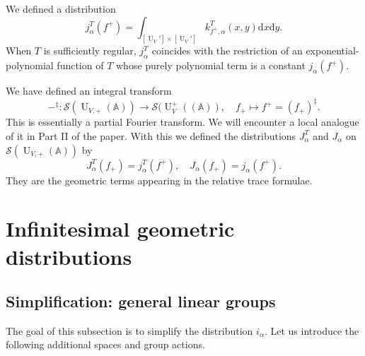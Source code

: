 \documentclass[letterpaper,11pt]{amsart}
\newcommand{\bA}{\mathbb{A}}
\newcommand{\cS}{\mathcal{S}}
\newcommand{\rd}{\mathrm{d}}
\newcommand{\<}{\negthickspace}
\DeclareMathOperator{\U}{U}
\theoremstyle{definition}
\theoremstyle{plain}
\theoremstyle{remark}
\numberwithin{equation}{section}
\begin{document}
We defined a distribution
    \[
        j^T_\alpha(f^+) = \int_{[\U_V'] \times [\U_V']}
        k_{f^+, \alpha}^T(x,y) \rd x \rd y.
        \]
When $T$ is sufficiently regular, $j^T_\alpha$ coincides with the restriction of an exponential-polynomial function of $T$ whose purely polynomial term is a constant $j_\alpha(f^+)$.

We have defined an integral transform
    \begin{equation}    \label{eq:global_ddag_map}
    -^\ddag: \cS(\U_{V,+}(\bA)) \to \cS(\U_{V}^+((\bA)), \quad f_+ \mapsto f^+ = (f_+)^{\ddag}.
    \end{equation}
This is essentially a partial Fourier transform. We will encounter a local analogue of it in Part II of the paper. With this we defined the distributions
$J_{\alpha}^T$ and $J_{\alpha}$ on $\cS(\U_{V,+}(\bA))$ by
    \[
    J_{\alpha}^T(f_+) = j_{\alpha}^T(f^+), \quad
    J_{\alpha}(f_+) = j_{\alpha}(f^+).
    \]
They are the geometric terms appearing in the relative trace formulae.






\section{Infinitesimal geometric distributions} \label{sec:infinitesimal_geo}




\subsection{Simplification: general linear groups}
The goal of this subsection is to simplify the distribution $i_{\alpha}$.
Let us introduce the following additional spaces and group actions.
\end{document}
